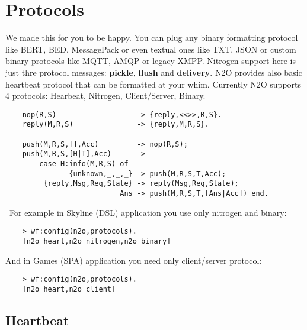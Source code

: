 
\section{Protocols}

We made this for you to be happy.
You can plug any binary formatting protocol like BERT, BED, MessagePack
or even textual ones like TXT, JSON or custom binary protocols like MQTT, AMQP or legacy XMPP.
Nitrogen-support here is just thre protocol messages: {\bf pickle}, {\bf flush} and {\bf delivery}.
N2O provides also basic heartbeat protocol that can be formatted at your whim.
Currently N2O supports 4 protocols: Hearbeat, Nitrogen, Client/Server, Binary.

\vspace{1\baselineskip}
\begin{lstlisting}
    nop(R,S)                   -> {reply,<<>>,R,S}.
    reply(M,R,S)               -> {reply,M,R,S}.

    push(M,R,S,[],Acc)         -> nop(R,S);
    push(M,R,S,[H|T],Acc)      -> 
        case H:info(M,R,S) of
               {unknown,_,_,_} -> push(M,R,S,T,Acc);
         {reply,Msg,Req,State} -> reply(Msg,Req,State);
                           Ans -> push(M,R,S,T,[Ans|Acc]) end.
\end{lstlisting}
\vspace{1\baselineskip}

\
For example in Skyline (DSL) application you use only nitrogen and binary:

\vspace{1\baselineskip}
\begin{lstlisting}
    > wf:config(n2o,protocols).
    [n2o_heart,n2o_nitrogen,n2o_binary]
\end{lstlisting}
\vspace{1\baselineskip}

And in Games (SPA) application you need only client/server protocol:

\vspace{1\baselineskip}
\begin{lstlisting}
    > wf:config(n2o,protocols).
    [n2o_heart,n2o_client]
\end{lstlisting}
\vspace{1\baselineskip}

\subsection{Heartbeat}

